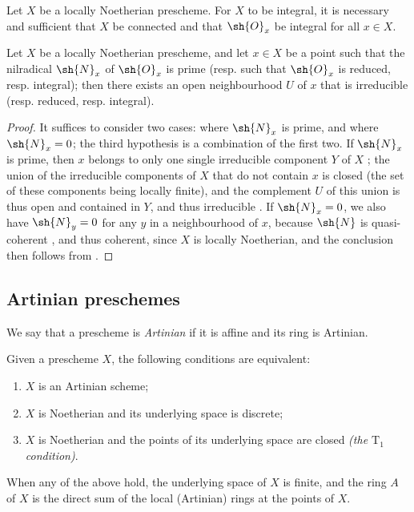 \begin{corollary}[6.1.12]
\label{I.6.1.12}
Let $X$ be a locally Noetherian prescheme.
For $X$ to be integral, it is necessary and sufficient that $X$ be connected and that $\sh{O}_x$ be integral for all $x\in X$.
\end{corollary}

\begin{proposition}[6.1.13]
\label{I.6.1.13}
Let $X$ be a locally Noetherian prescheme, and let $x\in X$ be a point such that the nilradical $\sh{N}_x$ of $\sh{O}_x$ is prime (resp. such that $\sh{O}_x$ is reduced, resp. integral);
then there exists an open neighbourhood $U$ of $x$ that is irreducible (resp. reduced, resp. integral).
\end{proposition}

\begin{proof}
It suffices to consider two cases: where $\sh{N}_x$ is prime, and where $\sh{N}_x=0$; the third hypothesis is a combination of the first two.
If $\sh{N}_x$ is prime, then $x$ belongs to only one single irreducible component $Y$ of $X$ ;
the union of the irreducible components of $X$ that do not contain $x$ is closed (the set of these components being locally finite), and the complement $U$ of this union is thus open and contained in $Y$, and thus irreducible .
If $\sh{N}_x=0$, we also have $\sh{N}_y=0$ for any $y$ in a neighbourhood of $x$, because $\sh{N}$ is quasi-coherent , and thus coherent, since $X$ is locally Noetherian, and the conclusion then follows from .
\end{proof}

\subsection{Artinian preschemes}
\label{subsection:I.6.2}
\label{I.6.2}

\begin{definition}[6.2.1]
\label{I.6.2.1}
We say that a prescheme is \emph{Artinian} if it is affine and its ring is Artinian.
\end{definition}

\begin{proposition}[6.2.2]
\label{I.6.2.2}
Given
a prescheme $X$, the following conditions are equivalent:
\begin{enumerate}
  \item[{\rm(a)}] $X$ is an Artinian scheme;
  \item[{\rm(b)}] $X$ is Noetherian and its underlying space is discrete;
  \item[{\rm(c)}] $X$ is Noetherian and the points of its underlying space are closed \emph{(the $\mathrm{T}_1$ condition)}.
\end{enumerate}
When any of the above hold, the underlying space of $X$ is finite, and the ring $A$ of $X$ is the direct sum of the local (Artinian) rings at the points of $X$.
\end{proposition}


